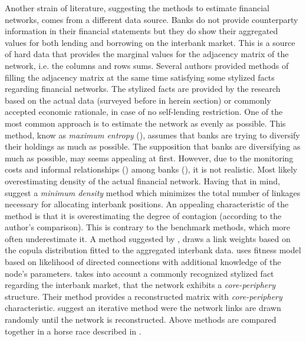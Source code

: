 \documentclass[12pt]{article}
\begin{document}
Another strain of literature, suggesting the methods to estimate financial networks, comes from a different data source. Banks do not provide counterparty information in their financial statements but they do show their aggregated values for both lending and borrowing on the interbank market. This is a source of hard data that provides the marginal values for the adjacency matrix of the network, i.e. the columns and rows sums. Several authors provided methods of filling the adjacency matrix at the same time satisfying some stylized facts regarding financial networks. The stylized facts are provided by the research based on the actual data (surveyed before in herein section) or commonly accepted economic rationale, in case of no self-lending restriction. One of the most common approach is to estimate the network as evenly as possible. This method, know as \textit{maximum entropy} (\cite{upper11}), assumes that banks are trying to diversify their holdings as much as possible. The supposition that banks are diversifying as much as possible, may seems appealing at first. However, due to the monitoring costs and informal relationships (\cite{brauning16}) among banks (\cite{cocco09}), it is not realistic. Most likely overestimating density of the actual financial network. Having that in mind, \cite{anand15} suggest a \textit{minimum density} method which minimizes the total number of linkages necessary for allocating interbank positions. An appealing characteristic of the method is that it is overestimating the degree of contagion (according to the author's comparison). This is contrary to the benchmark methods, which more often underestimate it. A method suggested by \cite{baral12}, draws a link weights based on the copula distribution fitted to the aggregated interbank data. \cite{cimini15} uses fitness model based on likelihood  of directed connections with additional knowledge of the node's parameters. \citet{drehmann13} takes into account a commonly recognized stylized fact regarding the interbank market, that the network exhibits a \textit{core-periphery} structure. Their method provides a reconstructed matrix with \textit{core-periphery} characteristic. \cite{halaj13} suggest an iterative method were the network links are drawn randomly until the network is reconstructed. Above methods are compared together in a horse race described in \cite{anand18}.
\end{document}
